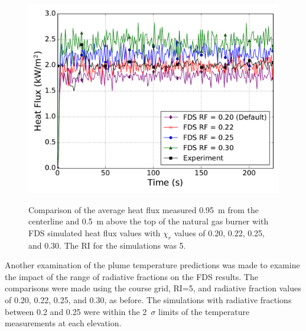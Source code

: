 \documentclass[twoside]{uocthesis}
\begin{document}
{\begin{figure}
	\includegraphics[width=5in]{../Figures/FHNG01_HF_RI5} \\
	\caption[Comparison of the average heat flux measured 0.95~m from the centerline and 0.5~m above the top of the natural gas burner with FDS simulated heat flux values based on varied $\chi_r$ values.]{Comparison of the average heat flux measured 0.95~m from the centerline and 0.5~m above the top of the natural gas burner with FDS simulated heat flux values with $\chi_r$ values of 0.20, 0.22, 0.25, and 0.30.  The RI for the simulations was 5.}
	\label{FHNG01_HF_RI5}
\end{figure}

Another examination of the plume temperature predictions was made to examine the impact of the range of radiative fractions on the FDS results.  The comparisons were made using the course grid, RI=5, and radiative fraction values of 0.20, 0.22, 0.25, and 0.30, as before. The simulations with radiative fractions between 0.2 and 0.25 were within the 2~$\sigma$ limits of the temperature measurements at each elevation.   

}
\end{document}
